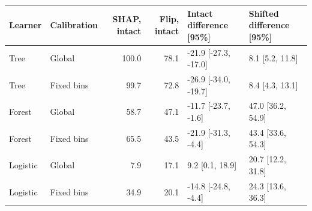 \begin{tabular}{llrrll}
\toprule
Learner & Calibration & SHAP, intact & Flip, intact & Intact difference [95\%] & Shifted difference [95\%] \\
\midrule
Tree & Global & 100.0 & 78.1 & -21.9 [-27.3, -17.0] & 8.1 [5.2, 11.8] \\
Tree & Fixed bins & 99.7 & 72.8 & -26.9 [-34.0, -19.7] & 8.4 [4.3, 13.1] \\
Forest & Global & 58.7 & 47.1 & -11.7 [-23.7, -1.6] & 47.0 [36.2, 54.9] \\
Forest & Fixed bins & 65.5 & 43.5 & -21.9 [-31.3, -4.4] & 43.4 [33.6, 54.3] \\
Logistic & Global & 7.9 & 17.1 & 9.2 [0.1, 18.9] & 20.7 [12.2, 31.8] \\
Logistic & Fixed bins & 34.9 & 20.1 & -14.8 [-24.8, -4.4] & 24.3 [13.6, 36.3] \\
\bottomrule
\end{tabular}
